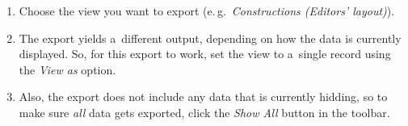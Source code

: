 \documentclass[12pt,a4paper]{scrartcl}
\begin{document}
\begin{enumerate}
  \item
    Choose the view you want to export
    (e.\,g.\ \emph{Constructions (Editors' layout)}).\\[1ex]{}

  \item
    The export yields a~different output, depending on how the data is currently
    displayed.
    So, for this export to work, set the view to a~single record using the
    \emph{View as} option.\\[1ex]{}

    \newpage
  \item
    Also, the export does not include any data that is currently hidding, so
    to make sure \emph{all} data gets exported, click the \emph{Show All} button
    in the toolbar.\\[1ex]{}



\end{enumerate}
\end{document}
